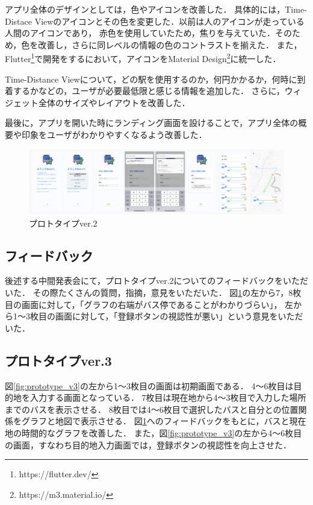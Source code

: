 アプリ全体のデザインとしては，色やアイコンを改善した．
具体的には，Time-Distace Viewのアイコンとその色を変更した．以前は人のアイコンが走っている人間のアイコンであり，
赤色を使用していたため，焦りを与えていた．そのため，色を改善し，さらに同レベルの情報の色のコントラストを揃えた．
また，Flutter\footnote{https://flutter.dev/}で開発をするにおいて，アイコンをMaterial Design\footnote{https://m3.material.io/}に統一した．

Time-Distance Viewについて，どの駅を使用するのか，何円かかるか，何時に到着するかなどの，ユーザが必要最低限と感じる情報を追加した．
さらに，ウィジェット全体のサイズやレイアウトを改善した．

最後に，アプリを開いた時にランディング画面を設けることで，アプリ全体の概要や印象をユーザがわかりやすくなるよう改善した．

\begin{figure}[H]
    \centering
    \includegraphics[width=14cm]{images/prototype_v2.png}
    \caption{プロトタイプver.2}
    \label{fig:prototype_v2}
\end{figure}

\subsection{フィードバック}
後述する中間発表会にて，プロトタイプver.2についてのフィードバックをいただいた．
その際たくさんの質問，指摘，意見をいただいた．
図\ref{fig:prototype_v2}の左から7，8枚目の画面に対して，「グラフの右端がバス停であることがわかりづらい」，
左から1〜3枚目の画面に対して，「登録ボタンの視認性が悪い」という意見をいただいた．

\subsection{プロトタイプver.3}
図\ref{fig:prototype_v3}の左から1〜3枚目の画面は初期画面である．
4〜6枚目は目的地を入力する画面となっている．
7枚目は現在地から4〜3枚目で入力した場所までのバスを表示させる．
8枚目では4〜6枚目で選択したバスと自分との位置関係をグラフと地図で表示させる．
図\ref{fig:prototype_v2}へのフィードバックをもとに，バスと現在地の時間的なグラフを改善した．
また，図\ref{fig:prototype_v3}の左から4〜6枚目の画面，すなわち目的地入力画面では，登録ボタンの視認性を向上させた．

